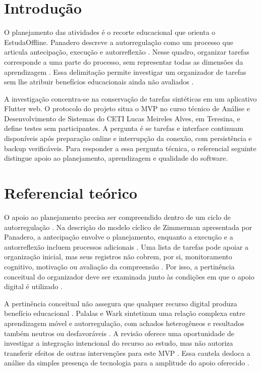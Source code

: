 \clearpage\section{Introdução}

O planejamento das atividades é o recorte educacional que orienta o EstudaOffline. Panadero descreve a autorregulação como um processo que articula antecipação, execução e autorreflexão \citep[p. 1, 3]{SU10}. Nesse quadro, organizar tarefas corresponde a uma parte do processo, sem representar todas as dimensões da aprendizagem \citep[p. 1, 3]{SU10}. Essa delimitação permite investigar um organizador de tarefas sem lhe atribuir benefícios educacionais ainda não avaliados \citep[p. 1, 3]{SU10}.

A investigação concentra-se na conservação de tarefas sintéticas em um aplicativo Flutter web. O protocolo do projeto situa o MVP no curso técnico de Análise e Desenvolvimento de Sistemas do CETI Lucas Meireles Alves, em Teresina, e define testes sem participantes. A pergunta é se tarefas e interface continuam disponíveis após preparação online e interrupção da conexão, com persistência e backup verificáveis. Para responder a essa pergunta técnica, o referencial seguinte distingue apoio ao planejamento, aprendizagem e qualidade do software.

\clearpage\section{Referencial teórico}

O apoio ao planejamento precisa ser compreendido dentro de um ciclo de autorregulação \citep[p. 1, 3]{SU10}. Na descrição do modelo cíclico de Zimmerman apresentada por Panadero, a antecipação envolve o planejamento, enquanto a execução e a autorreflexão incluem processos adicionais \citep[p. 1, 3]{SU10}. Uma lista de tarefas pode apoiar a organização inicial, mas seus registros não cobrem, por si, monitoramento cognitivo, motivação ou avaliação da compreensão \citep[p. 1, 3]{SU10}. Por isso, a pertinência conceitual do organizador deve ser examinada junto às condições em que o apoio digital é utilizado \citep[p. 1, 3]{SU10}.

A pertinência conceitual não assegura que qualquer recurso digital produza benefício educacional \citep[p. 156, 164–165]{education_palalas2020}. Palalas e Wark sintetizam uma relação complexa entre aprendizagem móvel e autorregulação, com achados heterogêneos e resultados também neutros ou desfavoráveis \citep[p. 156, 164–165]{education_palalas2020}. A revisão oferece uma oportunidade de investigar a integração intencional do recurso ao estudo, mas não autoriza transferir efeitos de outras intervenções para este MVP \citep[p. 156, 164–165]{education_palalas2020}. Essa cautela desloca a análise da simples presença de tecnologia para a amplitude do apoio oferecido \citep[p. 156, 164–165]{education_palalas2020}.

